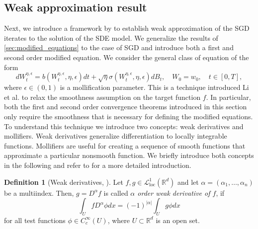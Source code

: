 \documentclass[12pt]{article}
\theoremstyle{definition}
\newtheorem{definition}[definition]{Definition}
\numberwithin{equation}{section}
\newcommand{\R}{\mathbb{R}}
\newcommand{\CL}{\mathcal{L}}
\begin{document}
\subsection{Weak approximation result}
Next, we introduce a framework by \autocite{liStochasticModifiedEquations2019} to establish weak approximation of the SGD iterates to the solution of the SDE model. We generalize the results of \autoref{sec:modified_equations} to the case of SGD and introduce both a first and second order modified equation.
We consider the general class of equation of the form
\begin{equation}
  \label{eq:general_sde}
  dW^{\eta, \epsilon}_t = b(W^{\eta, \epsilon}_t, \eta, \epsilon)dt + \sqrt{\eta}\sigma(W^{\eta, \epsilon}_t, \eta, \epsilon)dB_t, \quad W_0 = w_0, \quad t \in [0,T],
\end{equation}
where $\epsilon \in (0,1)$ is a mollification parameter. This is a technique introduced Li et al. \cite{liStochasticModifiedEquations2019} to relax the smoothness assumption on the target function $f$. In particular, both the first and second order convergence theorems introduced in this section only require the smoothness that is necessary for defining the modified equations.
To understand this technique we introduce two concepts: weak derivatives and mollifiers. Weak derivatives generalize differentiation to locally integrable functions. Mollifiers are useful for creating a sequence of smooth functions that approximate a particular nonsmooth function. We briefly introduce both concepts in the following and refer to \cite{evansPartialDifferentialEquations2010} for a more detailed introduction.
\begin{definition}[Weak derivatives, ]
  Let $f,g \in \CL^1_{\text{loc}}(\R^d)$ and let $\alpha = (\alpha_1, \dots, \alpha_n)$ be a multiindex. Then, $g = D^{\alpha} f$ is called \emph{$\alpha$ order weak derivative of $f$}, if
  \begin{equation}
    \label{eq:weak_derivative}
    \int_U f D^{\alpha} \phi dx = (-1)^{|\alpha|} \int_U g \phi dx
  \end{equation}
  for all test functions $\phi \in C_c^{\infty}(U)$, where $U \subset \R^d$ is an open set.
\end{definition}
\end{document}

